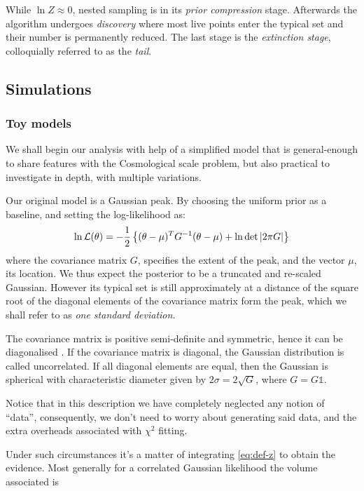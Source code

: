 \documentclass[usenatbib]{mnras}
\begin{document}
While \(\ln Z \approx 0\), nested sampling is in its \emph{prior
compression} stage.  Afterwards the algorithm undergoes \emph{discovery}
where most live points enter the typical set and their number is
permanently reduced. The last stage is the \emph{extinction stage},
colloquially referred to as the \emph{tail}.


\subsection{Simulations}
\label{sec:org953176f}
\subsubsection{Toy models}
\label{sec:org62b2005}

We shall begin our analysis with help of a simplified model that is
general-enough to share features with the Cosmological scale
problem, but also practical to investigate in depth, with multiple
variations.

Our original model is a Gaussian peak. By choosing the uniform
prior as a baseline, and setting the log-likelihood as:
\begin{equation}
  \ln {\cal L}(\theta) = - \frac{1}{2} \left\{(\theta - \mu)^{T}G^{-1}(\theta-\mu)  + \ln \det \left| 2\pi G\right| \right\}
\end{equation}
where the covariance matrix \(G\), specifies the extent of the peak,
and the vector \(\mu\), its location. We thus expect the posterior
to be a truncated and re-scaled Gaussian. However its typical set
is still approximately at a distance of the square root of the
diagonal elements of the covariance matrix form the peak, which we
shall refer to as \emph{one standard deviation}.

The covariance matrix is positive semi-definite and symmetric,
hence it can be diagonalised \citep{taboga2017lectures}. If the
covariance matrix is diagonal, the Gaussian distribution is called
uncorrelated. If all diagonal elements are equal, then the
Gaussian is spherical with characteristic diameter given by \(2
	\sigma = 2\sqrt{G}\), where \(G = G \mathds{1}\).

Notice that in this description we have completely neglected any
notion of ``data'', consequently, we don't need to worry about
generating said data, and the extra overheads associated with
\(\chi^2\) fitting.

Under such circumstances it's a matter of integrating \ref{eq:def-z}
to obtain the evidence. Most generally for a correlated Gaussian
likelihood the volume associated is 
\end{document}
